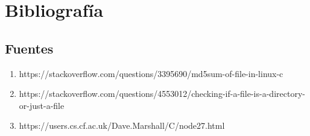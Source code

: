 \documentclass[10pt,a4paper]{report}
\begin{document}

\chapter{Bibliografía}
\section{Fuentes}
\begin{enumerate}
\item https://stackoverflow.com/questions/3395690/md5sum-of-file-in-linux-c
\item https://stackoverflow.com/questions/4553012/checking-if-a-file-is-a-directory-or-just-a-file
\item https://users.cs.cf.ac.uk/Dave.Marshall/C/node27.html
\end{enumerate}
\end{document}
